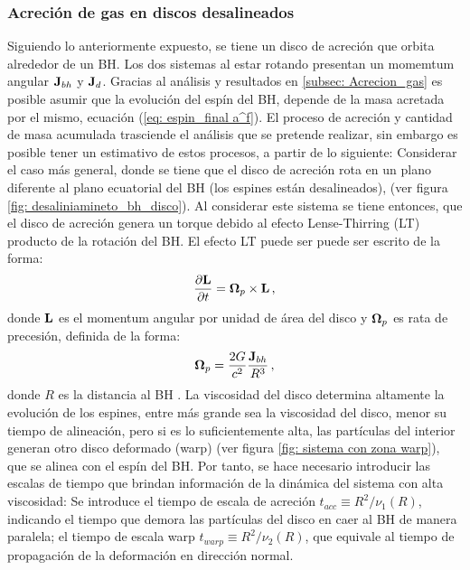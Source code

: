     \subsubsection{Acreción de gas en discos desalineados}
    \label{subsubsec: Acrecion gas desaliniado}
Siguiendo lo anteriormente expuesto, se tiene un disco de acreción que orbita alrededor de un BH. Los dos sistemas al estar rotando presentan un momemtum angular ${\bf{J}}_{bh}$ y ${\bf{J}}_{d}$. Gracias al análisis y resultados en \ref{subsec: Acrecion_gas} es posible asumir que la evolución del espín del BH, depende de la masa acretada por el mismo, ecuación (\ref{eq: espin_final a^f}). El proceso de acreción y cantidad de masa acumulada trasciende el análisis que se pretende realizar, sin embargo es posible tener un estimativo de estos procesos, a partir de lo siguiente: Considerar el caso más general, donde se tiene que el disco de acreción rota en un plano diferente al plano ecuatorial del BH (los espines están desalineados), (ver figura \ref{fig: desaliniamineto_bh_disco}). Al considerar este sistema se tiene entonces, que el disco de acreción genera un torque debido al efecto Lense-Thirring (LT) producto de la rotación del BH. El efecto LT puede ser puede ser escrito de la forma:
%
\begin{align}
    \frac{\partial {\bf{L}}}{\partial t}={\bf{\Omega}}_{p}\times{\bf{L}}\,,
    \label{eq: lense-Thirring}
\end{align}
%
donde ${\bf{L}}$ es el momentum angular por unidad de área del disco y ${\bf{\Omega}}_{p}$ es rata de precesión, definida de la forma:
%
\begin{align}
    {\bf{\Omega}}_{p}=\frac{2G}{c^{2}}\frac{{\bf{J}}_{bh}}{R^{3}}\,,
\end{align}
%
donde $R$ es la distancia al BH \cite{pringle1992}. La viscosidad del disco determina altamente la evolución de los espines, entre más grande sea la viscosidad del disco, menor su tiempo de alineación, pero si es lo suficientemente alta, las partículas del interior generan otro disco deformado (warp) (ver figura \ref{fig: sistema con zona warp}), que se alinea con el espín del BH. Por tanto, se hace necesario introducir las escalas de tiempo que brindan información de la dinámica del sistema con alta viscosidad: Se introduce el tiempo de escala de acreción $t_{acc}\equiv R^{2}/\nu_{1}(R)$, indicando el tiempo que demora las partículas del disco en caer al BH de manera paralela; el tiempo de escala warp $t_{warp}\equiv R^{2}/\nu_{2}(R)$, que equivale al tiempo de propagación de la deformación en dirección normal.  
